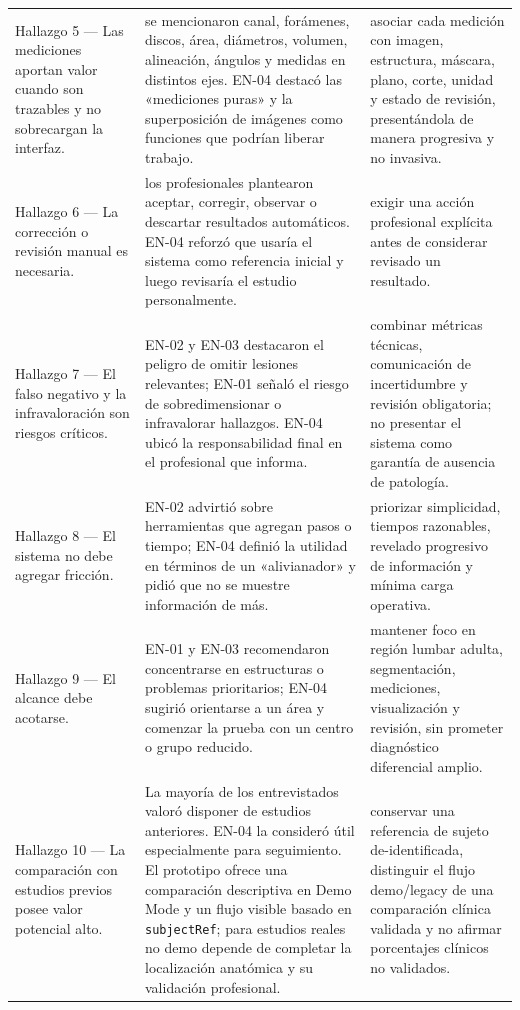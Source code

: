 {\begin{longtable}{>{\raggedright\arraybackslash}p{} >{\raggedright\arraybackslash}p{} >{\raggedright\arraybackslash}p{}}
Hallazgo 5 — Las mediciones aportan valor cuando son trazables y no sobrecargan la interfaz. & se mencionaron canal, forámenes, discos, área, diámetros, volumen, alineación, ángulos y medidas en distintos ejes. EN-04 destacó las «mediciones puras» y la superposición de imágenes como funciones que podrían liberar trabajo. & asociar cada medición con imagen, estructura, máscara, plano, corte, unidad y estado de revisión, presentándola de manera progresiva y no invasiva. \\
Hallazgo 6 — La corrección o revisión manual es necesaria. & los profesionales plantearon aceptar, corregir, observar o descartar resultados automáticos. EN-04 reforzó que usaría el sistema como referencia inicial y luego revisaría el estudio personalmente. & exigir una acción profesional explícita antes de considerar revisado un resultado. \\
Hallazgo 7 — El falso negativo y la infravaloración son riesgos críticos. & EN-02 y EN-03 destacaron el peligro de omitir lesiones relevantes; EN-01 señaló el riesgo de sobredimensionar o infravalorar hallazgos. EN-04 ubicó la responsabilidad final en el profesional que informa. & combinar métricas técnicas, comunicación de incertidumbre y revisión obligatoria; no presentar el sistema como garantía de ausencia de patología. \\
Hallazgo 8 — El sistema no debe agregar fricción. & EN-02 advirtió sobre herramientas que agregan pasos o tiempo; EN-04 definió la utilidad en términos de un «alivianador» y pidió que no se muestre información de más. & priorizar simplicidad, tiempos razonables, revelado progresivo de información y mínima carga operativa. \\
Hallazgo 9 — El alcance debe acotarse. & EN-01 y EN-03 recomendaron concentrarse en estructuras o problemas prioritarios; EN-04 sugirió orientarse a un área y comenzar la prueba con un centro o grupo reducido. & mantener foco en región lumbar adulta, segmentación, mediciones, visualización y revisión, sin prometer diagnóstico diferencial amplio. \\
Hallazgo 10 — La comparación con estudios previos posee valor potencial alto. & La mayoría de los entrevistados valoró disponer de estudios anteriores. EN-04 la consideró útil especialmente para seguimiento. El prototipo ofrece una comparación descriptiva en Demo Mode y un flujo visible basado en \texttt{subjectRef}; para estudios reales no demo depende de completar la localización anatómica y su validación profesional. & conservar una referencia de sujeto de-identificada, distinguir el flujo demo/legacy de una comparación clínica validada y no afirmar porcentajes clínicos no validados. \\

\end{longtable}}
